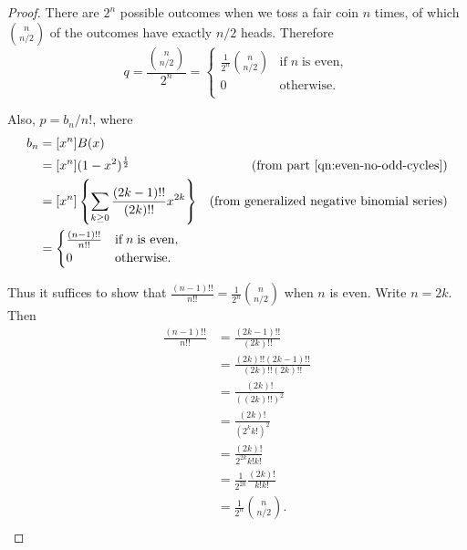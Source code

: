 \documentclass{article}
\begin{document}
\begin{enumerate}[label={(\alph*)}]
      \begin{proof}
        There are $2^n$ possible outcomes when we toss a fair coin $n$
        times, of which $\binom{n}{n/2}$ of the outcomes have exactly
        $n/2$ heads. Therefore
        \[q= \frac{\binom{n}{n/2}}{2^n}
        =\begin{cases}
          \frac{1}{2^n} \binom{n}{n/2} &\text{if}\; n\; \text{is even},\\
          0 &\text{otherwise}.\\
        \end{cases}\]

        Also, $p=b_n/n!$, where
        \begin{align*}
          b_n &=[x^n]B(x)\\
          &=[x^n](1-x^2)^{\frac{1}{2}} &\text{(from
            part~\ref{qn:even-no-odd-cycles})}\\
          &=[x^n] \left\{ \sum_{k\geq0} \frac{(2k-1)!!}{(2k)!!}
            x^{2k} \right\} &\text{(from generalized negative binomial
            series)}\\
          &=\begin{cases}
              \frac{(n-1)!!}{n!!} &\text{if}\; n\; \text{is even},\\
              0 &\text{otherwise}.\\
            \end{cases}\\
        \end{align*}

        Thus it suffices to show that $\frac{(n-1)!!}{n!!} =\frac{1}{2^n}
        \binom{n}{n/2}$ when $n$ is even. Write $n=2k$. Then
        \begin{align*}
          \frac{(n-1)!!}{n!!} &=\frac{(2k-1)!!}{(2k)!!}\\
          &=\frac{(2k)!!(2k-1)!!}{(2k)!!(2k)!!}\\
          &=\frac{(2k)!}{((2k)!!)^2}\\
          &=\frac{(2k)!}{(2^kk!)^2}\\
          &=\frac{(2k)!}{2^{2k}k!k!}\\
          &=\frac{1}{2^{2k}} \frac{(2k)!}{k!k!}\\
          &=\frac{1}{2^{n}} \binom{n}{n/2}.\\
        \end{align*}
      \end{proof}
  \end{enumerate}
\end{document}
